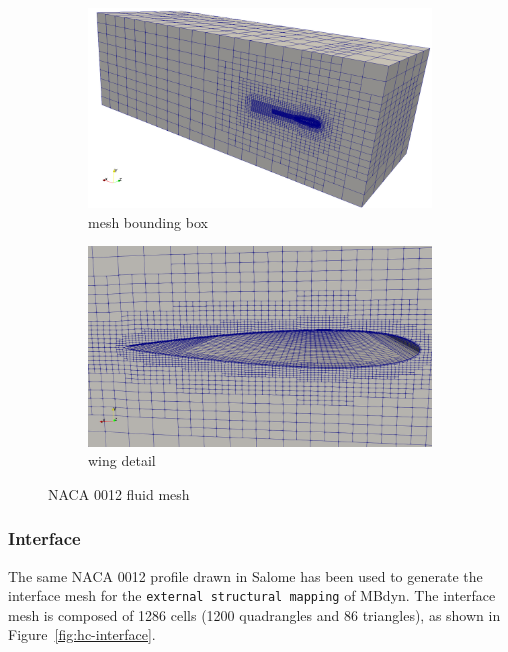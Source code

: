 \begin{figure}[htbp!]
	\centering
	\begin{subfigure}{.75\textwidth}
		\centering
		\includegraphics[width=.99\linewidth]{images/heathcote/dom03.png}
		\caption{mesh bounding box}
	\end{subfigure}
	\newline
	
	\centering
	\begin{subfigure}{.75\textwidth}
		\centering
		\includegraphics[width=.99\linewidth]{images/heathcote/dom02.png}
		\caption{wing detail}
	\end{subfigure}
	\caption{NACA 0012 fluid mesh}
	\label{fig:hc-mesh}
\end{figure}



\subsubsection{Interface}

The same NACA 0012 profile drawn in Salome has been used to generate the interface mesh for the \texttt{external structural mapping} of MBdyn. The interface mesh is composed of 1286 cells (1200 quadrangles and 86 triangles), as shown in Figure~\ref{fig:hc-interface}.

